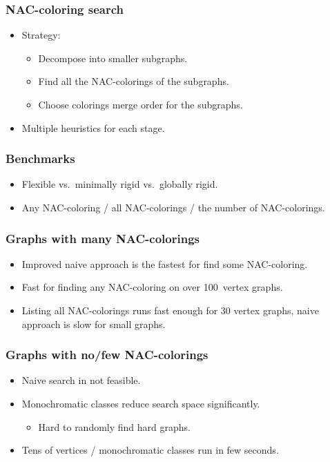 \documentclass{beamer}
\begin{document}
\begin{frame}
	\frametitle{NAC-coloring search}
	\begin{itemize}
		\item
		      Strategy:
		      \begin{itemize}
			      \item
			            Decompose into smaller subgraphs.
			      \item
			            Find all the NAC-colorings of the subgraphs.
			      \item
			            Choose colorings merge order for the subgraphs.
		      \end{itemize}
		\item
		      Multiple heuristics for each stage.
	\end{itemize}
\end{frame}

\begin{frame}
	\frametitle{Benchmarks}
	\begin{itemize}
		\item
		      Flexible vs.\ minimally rigid vs.\ globally rigid.
		\item
		      Any NAC-coloring / all NAC-colorings / the number of NAC-colorings.
	\end{itemize}
\end{frame}

\begin{frame}
	\frametitle{Graphs with many NAC-colorings}
	\begin{itemize}
		\item
		      Improved naive approach is the fastest for find some NAC-coloring.
		\item
		      Fast for finding any NAC-coloring on over 100 vertex graphs.
		\item
		      Listing all NAC-colorings runs fast enough for 30 vertex graphs,
		      naive approach is slow for small graphs.
	\end{itemize}
\end{frame}

\begin{frame}
	\frametitle{Graphs with no/few NAC-colorings}
	\begin{itemize}
		\item
		      Naive search in not feasible.
		\item
		      Monochromatic classes reduce search space significantly.
		      \begin{itemize}
			      \item Hard to randomly find hard graphs.
		      \end{itemize}
		\item
		      Tens of vertices / monochromatic classes run in few seconds.
	\end{itemize}
\end{frame}
\end{document}
